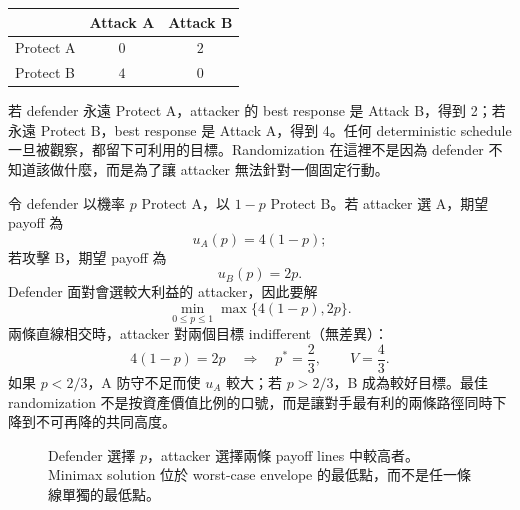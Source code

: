 \documentclass[11pt,a4paper,oneside,openany]{book}
\begin{document}
\begin{center}
\begin{tabular}{@{}lcc@{}}
\toprule
 & Attack A & Attack B \\
\midrule
Protect A & $0$ & $2$ \\
Protect B & $4$ & $0$ \\
\bottomrule
\end{tabular}
\end{center}

若 defender 永遠 Protect A，attacker 的 best response 是 Attack B，得到 2；若永遠 Protect B，best response 是 Attack A，得到 4。任何 deterministic schedule 一旦被觀察，都留下可利用的目標。Randomization 在這裡不是因為 defender 不知道該做什麼，而是為了讓 attacker 無法針對一個固定行動。

令 defender 以機率 $p$ Protect A，以 $1-p$ Protect B。若 attacker 選 A，期望 payoff 為
\[
 u_A(p)=4(1-p);
\]
若攻擊 B，期望 payoff 為
\[
 u_B(p)=2p.
\]
Defender 面對會選較大利益的 attacker，因此要解
\begin{equation}
 \min_{0\le p\le1}\max\{4(1-p),2p\}.
 \label{eq:patrol-minimax}
\end{equation}
兩條直線相交時，attacker 對兩個目標 indifferent（無差異）：
\[
 4(1-p)=2p
 \quad\Longrightarrow\quad
 p^*=\frac23,
 \qquad
 V=\frac43.
\]
如果 $p<2/3$，A 防守不足而使 $u_A$ 較大；若 $p>2/3$，B 成為較好目標。最佳 randomization 不是按資產價值比例的口號，而是讓對手最有利的兩條路徑同時下降到不可再降的共同高度。

\begin{figure}[htbp]
\centering
{}
\caption{Defender 選擇 $p$，attacker 選擇兩條 payoff lines 中較高者。Minimax solution 位於 worst-case envelope 的最低點，而不是任一條線單獨的最低點。}
\label{fig:patrol-minimax}
\end{figure}
\end{document}

